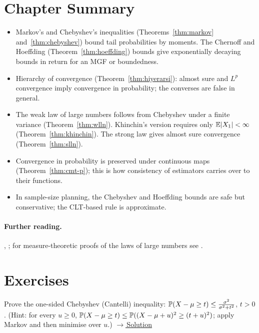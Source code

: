 \documentclass[main.tex]{subfiles}
\begin{document}
\section{Chapter Summary}
\begin{summary}
\begin{itemize}
  \item Markov's and Chebyshev's inequalities (Theorems~\ref{thm:markov} and~\ref{thm:chebyshev}) bound tail probabilities by moments. The Chernoff and Hoeffding (Theorem~\ref{thm:hoeffding}) bounds give exponentially decaying bounds in return for an MGF or boundedness.
  \item Hierarchy of convergence (Theorem~\ref{thm:hiyerarsi}): almost sure and $L^p$ convergence imply convergence in probability; the converses are false in general.
  \item The weak law of large numbers follows from Chebyshev under a finite variance (Theorem~\ref{thm:wlln}). Khinchin's version requires only $\E|X_1|<\infty$ (Theorem~\ref{thm:khinchin}). The strong law gives almost sure convergence (Theorem~\ref{thm:slln}).
  \item Convergence in probability is preserved under continuous maps (Theorem~\ref{thm:cmt-p}); this is how consistency of estimators carries over to their functions.
  \item In sample-size planning, the Chebyshev and Hoeffding bounds are safe but conservative; the CLT-based rule is approximate.
\end{itemize}
\end{summary}

\paragraph{Further reading.} \cite[Section~5.5]{casella}, \cite[Chapters~4--5]{wasserman}; for measure-theoretic proofs of the laws of large numbers see \cite[Chapter~2]{durrett}.

\section{Exercises}

\begin{exercise}\label{exr:05-1}
Prove the one-sided Chebyshev (Cantelli) inequality: $\P(X-\mu\ge t)\le\frac{\sigma^2}{\sigma^2+t^2}$, $t>0$. (Hint: for every $u\ge0$, $\P(X-\mu\ge t)\le\P((X-\mu+u)^2\ge(t+u)^2)$; apply Markov and then minimise over $u$.)
\hfill\hyperref[coz:05-1]{\footnotesize$\rightarrow$\,Solution}
\end{exercise}
\end{document}
